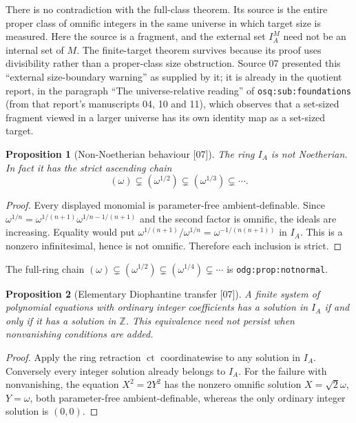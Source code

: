 \documentclass[11pt,a4paper]{article}
\numberwithin{equation}{section}
\newtheorem{proposition}[proposition]{Proposition}
\theoremstyle{definition}
\theoremstyle{remark}
\newcommand{\Z}{\mathbb Z}
\newcommand{\ct}{\operatorname{ct}}
\newcommand{\src}[1]{\textup{\textsf{\small[#1]}}}
\newcommand{\lbl}[1]{\nolinkurl{#1}}
\begin{document}
There is no contradiction with the full-class theorem. Its source is the
entire proper class of omnific integers in the same universe in which
target size is measured. Here the source is a fragment, and the external
set $I^M_A$ need not be an internal set of $M$. The finite-target theorem
survives because its proof uses divisibility rather than a proper-class
size obstruction. Source 07 presented this ``external size-boundary
warning'' as supplied by it; it is already in the quotient report, in the
paragraph ``The universe-relative reading'' of \lbl{osq:sub:foundations}
(from that report's manuscripts 04, 10 and 11), which observes that a
set-sized fragment viewed in a larger universe has its own identity map as
a set-sized target.

\begin{proposition}[Non-Noetherian behaviour \src{07}]\label{dsn:prop:nonnoetherian}
The ring $I_A$ is not Noetherian. In fact it has the strict ascending chain
\[
 (\omega)\subsetneq(\omega^{1/2})\subsetneq(\omega^{1/3})\subsetneq\cdots.
\]
\end{proposition}
\begin{proof}
Every displayed monomial is parameter-free ambient-definable. Since
$\omega^{1/n}=\omega^{1/(n+1)}\omega^{1/n-1/(n+1)}$ and the second factor is
omnific, the ideals are increasing. Equality would put
$\omega^{1/(n+1)}/\omega^{1/n}=\omega^{-1/(n(n+1))}$ in $I_A$. This is a
nonzero infinitesimal, hence is not omnific. Therefore each inclusion is
strict.
\end{proof}

The full-ring chain $(\omega)\subsetneq(\omega^{1/2})\subsetneq
(\omega^{1/4})\subsetneq\cdots$ is \lbl{odg:prop:notnormal}.

\begin{proposition}[Elementary Diophantine transfer \src{07}]\label{dsn:prop:equations}
A finite system of polynomial equations with ordinary integer coefficients
has a solution in $I_A$ if and only if it has a solution in $\Z$. This
equivalence need not persist when nonvanishing conditions are added.
\end{proposition}
\begin{proof}
Apply the ring retraction $\ct$ coordinatewise to any solution in $I_A$.
Conversely every integer solution already belongs to $I_A$. For the
failure with nonvanishing, the equation $X^2=2Y^2$ has the nonzero omnific
solution $X=\sqrt2\omega$, $Y=\omega$, both parameter-free
ambient-definable, whereas the only ordinary integer solution is $(0,0)$.
\end{proof}
\end{document}
